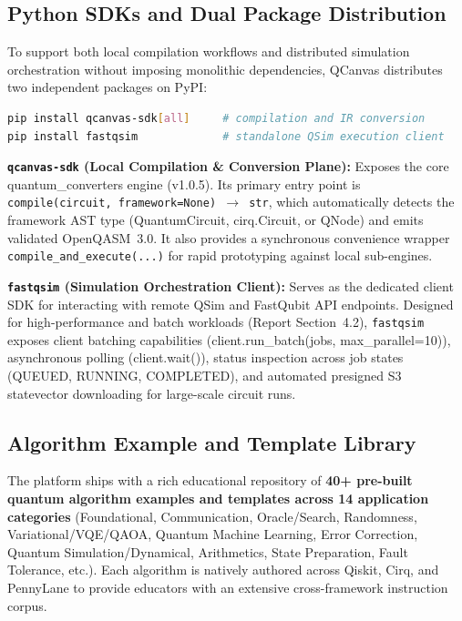\documentclass[runningheads]{llncs}
\begin{document}
\subsection{Python SDKs and Dual Package Distribution}

To support both local compilation workflows and distributed simulation orchestration without imposing monolithic dependencies, QCanvas distributes two independent packages on PyPI:

\begin{lstlisting}[language=bash]
pip install qcanvas-sdk[all]     # compilation and IR conversion
pip install fastqsim             # standalone QSim execution client
\end{lstlisting}

\textbf{\texttt{qcanvas-sdk} (Local Compilation \& Conversion Plane):} Exposes the core quantum\_converters engine (v1.0.5). Its primary entry point is \texttt{compile(circuit, framework=None) $\rightarrow$ str}, which automatically detects the framework AST type (QuantumCircuit, cirq.Circuit, or QNode) and emits validated OpenQASM~3.0. It also provides a synchronous convenience wrapper \texttt{compile\_and\_execute(...)} for rapid prototyping against local sub-engines.

\textbf{\texttt{fastqsim} (Simulation Orchestration Client):} Serves as the dedicated client SDK for interacting with remote QSim and FastQubit API endpoints. Designed for high-performance and batch workloads (Report Section~4.2), \texttt{fastqsim} exposes client batching capabilities (client.run\_batch(jobs, max\_parallel=10)), asynchronous polling (client.wait()), status inspection across job states (QUEUED, RUNNING, COMPLETED), and automated presigned S3 statevector downloading for large-scale circuit runs.

\subsection{Algorithm Example and Template Library}

The platform ships with a rich educational repository of \textbf{40+ pre-built quantum algorithm examples and templates across 14 application categories} (Foundational, Communication, Oracle/Search, Randomness, Variational/VQE/QAOA, Quantum Machine Learning, Error Correction, Quantum Simulation/Dynamical, Arithmetics, State Preparation, Fault Tolerance, etc.). Each algorithm is natively authored across Qiskit, Cirq, and PennyLane to provide educators with an extensive cross-framework instruction corpus.
\end{document}
